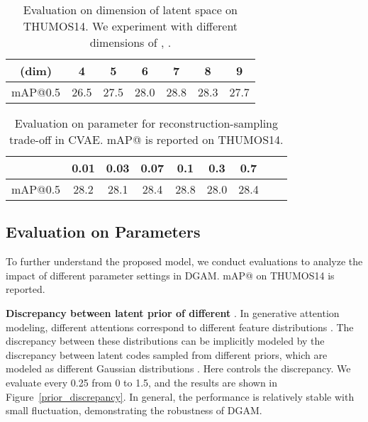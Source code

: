 \documentclass[10pt,twocolumn,letterpaper]{article}
\begin{document}
\begin{table}[h!]\small
\caption{Evaluation on dimension of latent space on THUMOS14. We experiment with different dimensions of , .}
\label{latent_dimension}
\vspace{-2em}
\begin{center}
\begin{tabular}{c|c c c c c c}
\hline
(dim)& 4 & 5 & 6 & 7 & 8 & 9\\
\hline \hline
mAP@0.5 & 26.5 & 27.5 & 28.0 & 28.8 & 28.3 & 27.7\\
\hline
\end{tabular}
\end{center}

\end{table}

\begin{table}[h!]\small
\caption{Evaluation on parameter for reconstruction-sampling trade-off in CVAE. mAP@ is reported on THUMOS14.}
\label{trade_off_CVAE}
\vspace{-2em}
\begin{center}
\begin{tabular}{c|c c c c c c c c}
\hline
 & 0.01 & 0.03 & 0.07 & 0.1 & 0.3 & 0.7\\
\hline \hline
mAP@0.5 & 28.2 & 28.1 & 28.4 & 28.8 & 28.0 & 28.4\\
\hline
\end{tabular}
\end{center}

\end{table}


\subsection{Evaluation on Parameters}

To further understand the proposed model, we conduct evaluations to analyze the impact of different parameter settings in DGAM. mAP@ on THUMOS14 is reported.





\textbf{Discrepancy between latent prior of different }.
In generative attention modeling, different attentions  correspond to different feature distributions .
The discrepancy between these distributions can be implicitly modeled by the
discrepancy between latent codes  sampled from different priors, which are modeled as different Gaussian distributions .
Here  controls the discrepancy.
We evaluate  every 0.25 from 0 to 1.5, and the results are shown in Figure~\ref{prior_discrepancy}.
In general, the performance is relatively stable with small fluctuation, demonstrating the robustness of DGAM.
\end{document}
